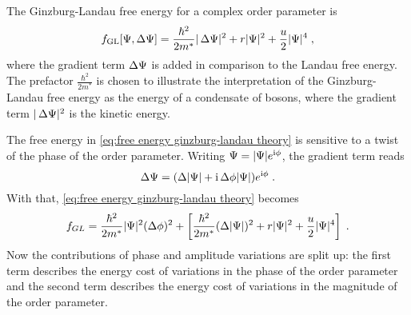 \documentclass[../notes.tex]{subfiles}
\begin{document}
The Ginzburg-Landau free energy for a complex order parameter is
\begin{equation}
	f_{\mathrm{GL}} [\Psi, \adif{\Psi}] = \frac{\hbar^2}{2m^*} \vert \adif{\Psi} \vert^2 + r \vert \Psi \vert^2 + \frac{u}{2} \vert \Psi \vert^4 \;,
	\label{eq:free energy ginzburg-landau theory}
\end{equation}
where the gradient term \(\adif{\Psi}\) is added in comparison to the Landau free energy.
The prefactor \(\frac{\hbar^2}{2m^*}\) is chosen to illustrate the interpretation of the Ginzburg-Landau free energy as the energy of a condensate of bosons, where the gradient term \(\vert \adif{\Psi} \vert^2\) is the kinetic energy.

The free energy in \cref{eq:free energy ginzburg-landau theory} is sensitive to a twist of the phase of the order parameter.
Writing \(\Psi = \vert \Psi \vert e^{\mathrm{i} \phi}\), the gradient term reads
\begin{equation}
	\Delta \Psi = (\adif{\vert \Psi \vert} + \iu \adif{\phi} \vert \Psi \vert) e^{\iu \phi} \;.
\end{equation}
With that, \cref{eq:free energy ginzburg-landau theory} becomes
\begin{equation}
	f_{GL}  = \frac{\hbar^2}{2m^*} \vert \Psi \vert^2 (\adif{\phi})^2 + \left[ \frac{\hbar^2}{2m^*} (\adif{\vert \Psi \vert})^2 + r \vert \Psi \vert^2 + \frac{u}{2} \vert \Psi \vert^4 \right] \;.
	\label{eq:free energy ginzburg-landau theory with phase}
\end{equation}
Now the contributions of phase and amplitude variations are split up: the first term describes the energy cost of variations in the phase of the order parameter and the second term describes the energy cost of variations in the magnitude of the order parameter.
\end{document}
